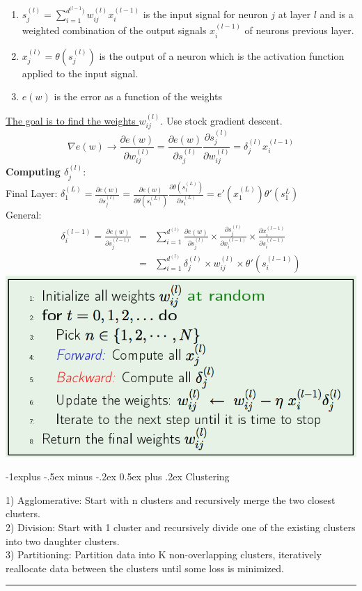 \documentclass[3pt,landscape]{article}
\makeatletter
\renewcommand{\subsection}{\@startsection{subsection}{2}{0mm}%
                            {-1explus -.5ex minus -.2ex}%
                            {0.5ex plus .2ex}%
                            {\normalfont\normalsize\bfseries}}
\makeatother
\begin{document}
\begin{multicols}{3}
\begin{enumerate}
\item \(s_j^{(l)} = \sum_{i=1}^{d^{(l-1})} w_{ij}^{(l)} x_i^{(l-1)}\) is the input signal for neuron $j$ at layer $l$ and is a weighted combination of the output signals $x_i^{(l-1)}$ of neurons previous layer.
\item \(x_j^{(l)} = \theta(s_j^{(l)})\) is the output of a neuron which is the activation function applied to the input signal.
\item $e(w)$ is the error as a function of the weights
\end{enumerate}
\underline{The goal is to find the weights $w_{ij}^{(l)}$}. Use stock gradient descent.
\[\nabla e(w) \rightarrow \frac{\partial e(w)}{\partial w_{ij}^{(l)}} = \frac{\partial e(w)}{\partial s_{j}^{(l)}} \frac{\partial s_{j}^{(l)}}{\partial w_{ij}^{(l)}} = \delta_j^{(l)}x_i^{(l-1)}\]
{\bf Computing $\delta_j^{(l)}$}:\\
Final Layer: \(\delta_1^{(L)} = \frac{\partial e(w)}{\partial s_{j}^{(l)}} = \frac{\partial e(w)}{\partial \theta(s_1^{(L)})} \frac{\partial \theta(s_1^{(L)})}{\partial s_{1}^{(L)}} = e'(x_1^{(L)}) \theta'(s_1^{L})\) \\
General: \begin{eqnarray*} \delta_i^{(l-1)} = \frac{\partial e(w)}{\partial s_{j}^{(l-1)}} &=& \sum_{i=1}^{d^{(l)}} \frac{\partial e(w)}{\partial s_{j}^{(l)}} \times \frac{\partial s_{j}^{(l)}}{\partial x_i^{(l-1)}} \times \frac{\partial x_i^{(l-1)}}{\partial s_i^{(l-1)}} \\
&=&  \sum_{i=1}^{d^{(l)}} \delta_j^{(l)} \times w_{ij}^{(l)} \times \theta'(s_i^{(l-1)}) \end{eqnarray*}
\includegraphics[scale=0.28]{NN1.pdf}


\subsection{Clustering}

1) Agglomerative: Start with n clusters and recursively merge the two closest clusters.\\
2) Division: Start with 1 cluster and recursively divide one of the existing clusters into two daughter clusters.\\
3) Partitioning: Partition data into K non-overlapping clusters, iteratively reallocate data between the clusters until some loss is minimized.
\newpage


\rule{0.3\linewidth}{0.25pt}
\scriptsize


\end{multicols}
\end{document}

